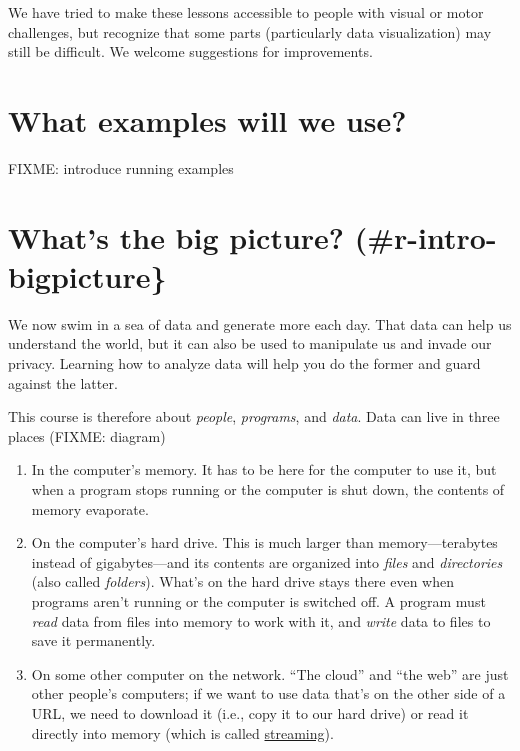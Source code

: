 \documentclass[]{Nemilov}
\begin{document}
We have tried to make these lessons accessible to people with visual or motor challenges,
but recognize that some parts (particularly data visualization) may still be difficult.
We welcome suggestions for improvements.

\hypertarget{r-intro-example}{%
\section{What examples will we use?}\label{r-intro-example}}

FIXME: introduce running examples

\hypertarget{whats-the-big-picture-r-intro-bigpicture}{%
\section{What's the big picture? (\#r-intro-bigpicture\}}\label{whats-the-big-picture-r-intro-bigpicture}}

We now swim in a sea of data and generate more each day.
That data can help us understand the world,
but it can also be used to manipulate us and invade our privacy.
Learning how to analyze data will help you do the former
and guard against the latter.

This course is therefore about \emph{people}, \emph{programs}, and \emph{data}.
Data can live in three places (FIXME: diagram)

\begin{enumerate}
\def\labelenumi{\arabic{enumi}.}
\item
  In the computer's memory.
  It has to be here for the computer to use it,
  but when a program stops running or the computer is shut down,
  the contents of memory evaporate.
\item
  On the computer's hard drive.
  This is much larger than memory---terabytes instead of gigabytes---and
  its contents are organized into \emph{files} and \emph{directories} (also called \emph{folders}).
  What's on the hard drive stays there even when programs aren't running or the computer is switched off.
  A program must \emph{read} data from files into memory to work with it,
  and \emph{write} data to files to save it permanently.
\item
  On some other computer on the network.
  ``The cloud'' and ``the web'' are just other people's computers;
  if we want to use data that's on the other side of a URL,
  we need to download it (i.e., copy it to our hard drive)
  or read it directly into memory (which is called \href{glossary.html\#streaming-data}{streaming}).
\end{enumerate}
\end{document}
